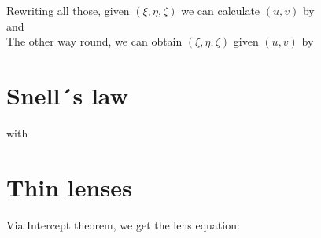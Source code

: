 \documentclass[a4paper,12pt,pdftex]{scrreprt}
\begin{document}
	Rewriting all those, given $(\xi,\eta,\zeta)$ we can calculate $(u,v)$ by\\
	 and 
	\\
	The other way round, we can obtain $(\xi,\eta,\zeta)$ given $(u,v)$ by\\

	\section{Snell´s law} %
	\label{sec:snell_s_law}
	 with 

	\section{Thin lenses} %
	\label{sec:thin_lenses}
	Via Intercept theorem, we get the lens equation:\\
\end{document}
